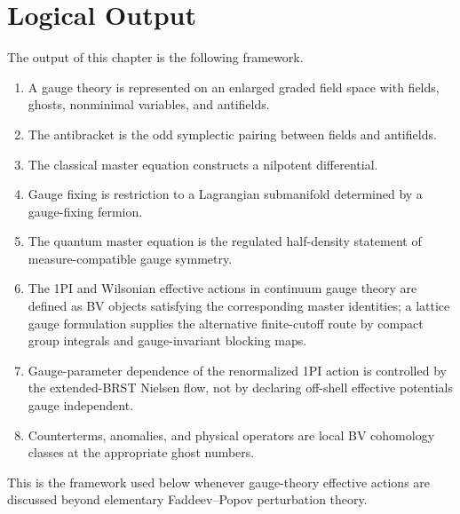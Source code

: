 \section{Logical Output}

The output of this chapter is the following framework.

\begin{enumerate}
  \item A gauge theory is represented on an enlarged graded field space with
  fields, ghosts, nonminimal variables, and antifields.
  \item The antibracket is the odd symplectic pairing between fields and
  antifields.
  \item The classical master equation constructs a nilpotent differential.
  \item Gauge fixing is restriction to a Lagrangian submanifold determined by
  a gauge-fixing fermion.
  \item The quantum master equation is the regulated half-density statement of
  measure-compatible gauge symmetry.
  \item The 1PI and Wilsonian effective actions in continuum gauge theory are
  defined as BV objects satisfying the corresponding master identities; a
  lattice gauge formulation supplies the alternative finite-cutoff route by
  compact group integrals and gauge-invariant blocking maps.
  \item Gauge-parameter dependence of the renormalized 1PI action is
  controlled by the extended-BRST Nielsen flow, not by declaring off-shell
  effective potentials gauge independent.
  \item Counterterms, anomalies, and physical operators are local BV
  cohomology classes at the appropriate ghost numbers.
\end{enumerate}

This is the framework used below whenever gauge-theory effective actions are
discussed beyond elementary Faddeev--Popov perturbation theory.

